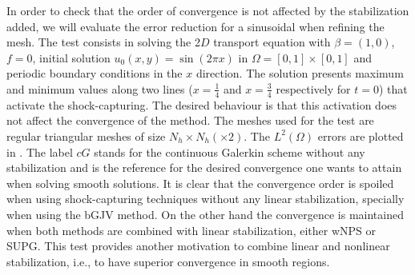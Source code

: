 In order to check that the order of convergence is not affected by the stabilization added, we will evaluate the error reduction for a sinusoidal when refining the mesh. The test consists in solving the 2$D$ transport equation  with $\beta = (1,0)$, $f=0$, initial solution $u_0(x,y) = \sin(2\pi x)$ in $\Omega=[0,1]\times[0,1]$ and periodic boundary conditions in the $x$ direction. The solution presents  maximum and minimum values along two lines ($x=\frac{1}{4}$ and $x=\frac{3}{4}$ respectively for $t=0$) that activate the shock-capturing. The desired behaviour is that this activation does not affect the convergence of the method. The meshes used for the test are regular triangular meshes of size $N_h\times N_h(\times 2)$. The $L^2(\Omega)$ errors are plotted in . The label $cG$ stands for the continuous Galerkin scheme without any stabilization and is the reference for the desired convergence one wants to attain when solving smooth solutions. It is clear that the convergence order is spoiled when using shock-capturing techniques without any linear stabilization, specially when using the bGJV method. On the other hand the convergence is maintained when both methods are combined with linear stabilization, either wNPS or SUPG. This test provides another motivation to combine linear and nonlinear stabilization, i.e., to have superior convergence in smooth regions.

